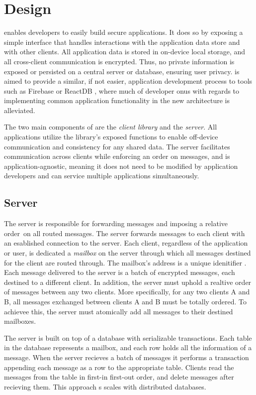 \section{Design}

\name{} enables developers to easily build secure applications. It does so by exposing a simple interface that handles interactions with the application data store and with other clients. All application data is stored in on-device local storage, and all cross-client communication is encrypted. Thus, no private information is exposed or persisted on a central server or database, ensuring user privacy. \name{} is aimed to provide a similar, if not easier, application development process to tools such as Firebase  or ReactDB \tocite{}, where much of developer onus with regards to implementing common application functionality in the new architecture is alleviated.

The two main components of \name{} are the \textit{client library} and the \textit{\name{} server}. All \name{} applications utilize the library's exposed functions to enable off-device communication and consistency for any shared data. The server facilitates communication across clients while enforcing an order on messages, and is application-agnostic, meaning it does not need to be modified by application developers and can service multiple applications simultaneously. 

\subsection{Server}
The server is responsible for forwarding messages and imposing a relative order\ on all routed messages. The server forwards messages to each client with an esablished connection to the server. Each client, regardless of the application or user, is dedicated a \textit{mailbox} on the server through which all messages destined for the client are routed through. The mailbox's address is a unique idenitifier . Each message delivered to the server is a batch of encrypted messages, each destined to a different client. In addition, the server must uphold a realtive order of messages between any two clients. More specifically, for any two clients A and B, all messages exchanged between clients A and B must be totally ordered. To achievee this, the server must atomically add all messages to their destined mailboxes. 

The \name{} server is built on top of a database with serializable transactions. Each table in the database represents a mailbox, and each row holds all the information of a message. When the server recieves a batch of messages it performs a transaction appending each message as a row to the appropriate table. Clients read the messages from the table in first-in first-out order, and delete messages after recieving them. This approach s scales with distributed databases. 

